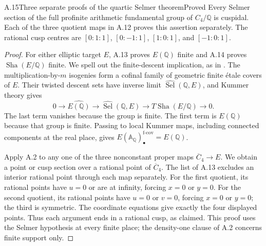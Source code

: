\begin{statement}{A.15}{Three separate proofs of the quartic Selmer theorem}{Proved}
Every Selmer section of the full profinite arithmetic fundamental group
of $C_4/\mathbb Q$ is cuspidal. Each of the three quotient maps in
A.12 proves this assertion separately. The rational cusp centres are
$[0:1:1]$, $[0:-1:1]$, $[1:0:1]$, and $[-1:0:1]$.
\end{statement}
\begin{proof}
For either elliptic target $E$, A.13 proves $E(\mathbb Q)$ finite and
A.14 proves $\operatorname{Sha}(E/\mathbb Q)$ finite. We spell out
the finite-descent implication, as in
\citet[Corollary 6.2 and its preceding argument]{AMStoll2007}.
The multiplication-by-$m$ isogenies form a cofinal family of geometric
finite \'etale covers of $E$. Their twisted descent sets have inverse
limit $\widehat{\operatorname{Sel}}(\mathbb Q,E)$, and Kummer theory gives
\[
 0\longrightarrow\widehat{E(\mathbb Q)}
  \longrightarrow\widehat{\operatorname{Sel}}(\mathbb Q,E)
  \longrightarrow T\operatorname{Sha}(E/\mathbb Q)
  \longrightarrow0.
\]
The last term vanishes because the group is finite. The first term is
$E(\mathbb Q)$ because that group is finite. Passing to local Kummer
maps, including connected components at the real place, gives
$E(\mathbb A_{\mathbb Q})_\bullet^{\mathrm{f\text{-}cov}}
=E(\mathbb Q)$.

Apply A.2 to any one of the three nonconstant proper maps
$\overline C_4\to E$. We obtain a point or cusp section over a rational
point of $\overline C_4$. The list of A.13 excludes an interior rational
point through each map separately. For the first quotient, its rational
points have $u=0$ or are at infinity, forcing $x=0$ or $y=0$. For the
second quotient, its rational points have $u=0$ or $v=0$, forcing $x=0$
or $y=0$; the third is symmetric. The coordinate equations give exactly
the four displayed points. Thus each argument ends in a rational cusp,
as claimed. This proof uses the Selmer hypothesis at every finite place;
the density-one clause of A.2 concerns finite support only.
\end{proof}

